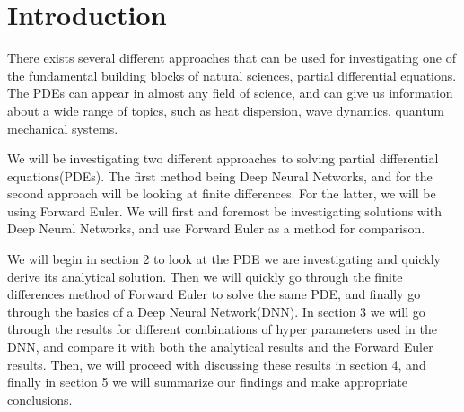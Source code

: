 \section{Introduction}
There exists several different approaches that can be used for investigating one of the fundamental building blocks of natural sciences, partial differential equations. The PDEs can appear in almost any field of science, and can give us information about a wide range of topics, such as heat dispersion, wave dynamics, quantum mechanical systems\citep[see][ch. 10]{hjorth-jensen_computational_2015}.

We will be investigating two different approaches to solving partial differential equations(PDEs). The first method being Deep Neural Networks, and for the second approach will be looking at finite differences. For the latter, we will be using Forward Euler. We will first and foremost be investigating solutions with Deep Neural Networks, and use Forward Euler as a method for comparison.

We will begin in section 2 to look at the PDE we are investigating and quickly derive its analytical solution. Then we will quickly go through the finite differences method of Forward Euler to solve the same PDE, and finally go through the basics of a Deep Neural Network(DNN). In section 3 we will go through the results for different combinations of hyper parameters used in the DNN, and compare it with both the analytical results and the Forward Euler results. Then, we will proceed with discussing these results in section 4, and finally in section 5 we will summarize our findings and make appropriate conclusions.